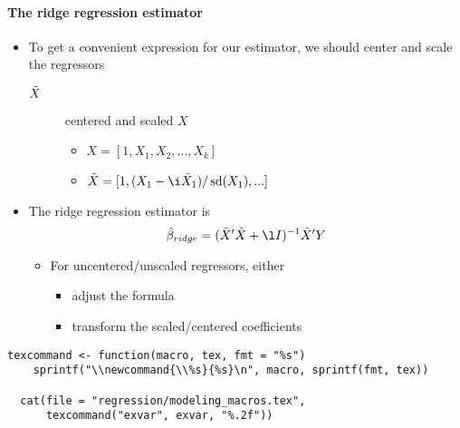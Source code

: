 \paragraph{The ridge regression estimator}
\begin{itemize}
\item To get a convenient expression for our estimator, we should center and scale the regressors
\begin{description}
\item[$\tilde{X}$] centered and scaled $X$
\begin{itemize}
\item $X = [1, X_1, X_2, ..., X_{k}]$
\item $\Xt = [1, (X_1 - \i \Xb_1) / \sd(X_1), ...]$
\end{itemize}
\end{description}
\item The ridge regression estimator is
  \[ \betah_{ridge} = (\Xt'\Xt + \l I)^{-1} \Xt'Y\]
\begin{itemize}
\item For uncentered/unscaled regressors, either
\begin{itemize}
\item adjust the formula
\item transform the scaled/centered coefficients
\end{itemize}
\end{itemize}
\end{itemize}

\begin{lstlisting}[print=false]
  texcommand <- function(macro, tex, fmt = "%s")
    sprintf("\\newcommand{\\%s}{%s}\n", macro, sprintf(fmt, tex))

  cat(file = "regression/modeling_macros.tex",
      texcommand("exvar", exvar, "%.2f"))
\end{lstlisting}

